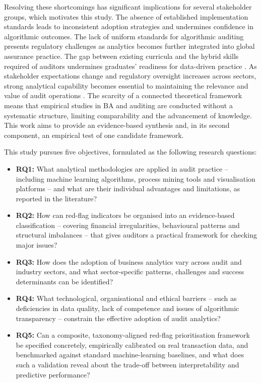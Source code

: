 \documentclass[preprint,12pt]{elsarticle}
\begin{document}
Resolving these shortcomings has significant implications for several stakeholder groups, which motivates this study. The absence of established implementation standards leads to inconsistent adoption strategies and undermines confidence in algorithmic outcomes. The lack of uniform standards for algorithmic auditing presents regulatory challenges as analytics becomes further integrated into global assurance practice. The gap between existing curricula and the hybrid skills required of auditors undermines graduates' readiness for data-driven practice \citep{akula2021}. As stakeholder expectations change and regulatory oversight increases across sectors, strong analytical capability becomes essential to maintaining the relevance and value of audit operations \citep{usul2025}. The scarcity of a connected theoretical framework means that empirical studies in BA and auditing are conducted without a systematic structure, limiting comparability and the advancement of knowledge. This work aims to provide an evidence-based synthesis and, in its second component, an empirical test of one candidate framework.

This study pursues five objectives, formulated as the following research questions:
\begin{itemize}
    \item \textbf{RQ1:} What analytical methodologies are applied in audit practice -- including machine learning algorithms, process mining tools and visualisation platforms -- and what are their individual advantages and limitations, as reported in the literature?
    \item \textbf{RQ2:} How can red-flag indicators be organised into an evidence-based classification -- covering financial irregularities, behavioural patterns and structural imbalances -- that gives auditors a practical framework for checking major issues?
    \item \textbf{RQ3:} How does the adoption of business analytics vary across audit and industry sectors, and what sector-specific patterns, challenges and success determinants can be identified?
    \item \textbf{RQ4:} What technological, organisational and ethical barriers -- such as deficiencies in data quality, lack of competence and issues of algorithmic transparency -- constrain the effective adoption of audit analytics?
    \item \textbf{RQ5:} Can a composite, taxonomy-aligned red-flag prioritisation framework be specified concretely, empirically calibrated on real transaction data, and benchmarked against standard machine-learning baselines, and what does such a validation reveal about the trade-off between interpretability and predictive performance?
\end{itemize}
\end{document}
